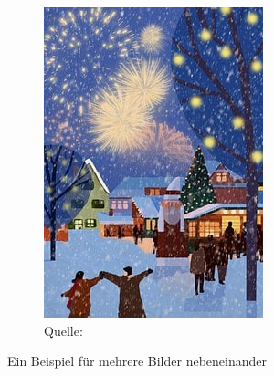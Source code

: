 \begin{figure}[!htbp]
\begin{subfigure}[t]{0.3\textwidth}
        \includegraphics[width=\textwidth]{images/mult2.jpg}
        \caption*{Quelle: \cite{bib:vodafone-legt-in-pirmasens}}
        \label{fig:winter-city}
    \end{subfigure}


    \caption{Ein Beispiel für mehrere Bilder nebeneinander}
\end{figure}

